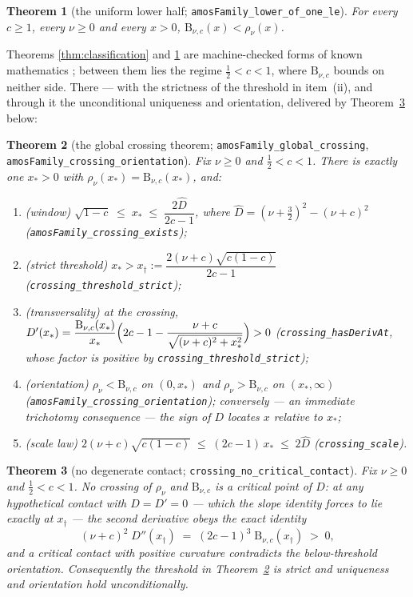 \documentclass[11pt]{article}
\newtheorem{theorem}{Theorem}[section]
\newcommand{\lean}[1]{\texttt{#1}}
\newcommand{\Bfam}{\mathrm{B}}
\begin{document}
\begin{theorem}[the uniform lower half;
\lean{amosFamily\_lower\_of\_one\_le}]\label{thm:lowerhalf}
For every $c \ge 1$, every $\nu \ge 0$ and every $x > 0$,
$\Bfam_{\nu,c}(x) < \rho_\nu(x)$.
\end{theorem}

Theorems \ref{thm:classification} and \ref{thm:lowerhalf} are
machine-checked forms of known mathematics \cite{RS16}; between
them lies the regime $\tfrac12 < c < 1$, where $\Bfam_{\nu,c}$
bounds on neither side.  There --- with the strictness of the
threshold in item~(ii), and through it the unconditional uniqueness
and orientation, delivered by Theorem~\ref{thm:nocontact} below:

\begin{theorem}[the global crossing theorem;
\lean{amosFamily\_global\_crossing},
\lean{amosFamily\_crossing\_orientation}]\label{thm:crossing}
Fix $\nu \ge 0$ and $\tfrac12 < c < 1$.  There is exactly one
$x_* > 0$ with $\rho_\nu(x_*) = \Bfam_{\nu,c}(x_*)$, and:
\begin{enumerate}
\item[(i)] \emph{(window)} $\sqrt{1-c} \;\le\; x_* \;\le\;
\dfrac{2\hat{D}}{2c-1}$, where
$\hat{D} = (\nu+\tfrac32)^2-(\nu+c)^2$
(\lean{amosFamily\_crossing\_exists});
\item[(ii)] \emph{(strict threshold)} $x_* > x_\dagger :=
\dfrac{2(\nu+c)\sqrt{c(1-c)}}{2c-1}$
(\lean{crossing\_threshold\_strict});
\item[(iii)] \emph{(transversality)} at the crossing,
$D'(x_*) = \dfrac{\Bfam_{\nu,c}(x_*)}{x_*}
\Bigl(2c-1-\dfrac{\nu+c}{\sqrt{(\nu+c)^2+x_*^2}}\Bigr) > 0$
(\lean{crossing\_hasDerivAt}, whose factor is positive by
\lean{crossing\_threshold\_strict});
\item[(iv)] \emph{(orientation)} $\rho_\nu < \Bfam_{\nu,c}$ on
$(0, x_*)$ and $\rho_\nu > \Bfam_{\nu,c}$ on $(x_*, \infty)$
(\lean{amosFamily\_crossing\_orientation}); conversely --- an
immediate trichotomy consequence --- the sign of $D$ locates $x$
relative to $x_*$;
\item[(v)] \emph{(scale law)} $2(\nu+c)\sqrt{c(1-c)} \;\le\;
(2c-1)\,x_* \;\le\; 2\hat{D}$ (\lean{crossing\_scale}).
\end{enumerate}
\end{theorem}

\begin{theorem}[no degenerate contact;
\lean{crossing\_no\_critical\_contact}]\label{thm:nocontact}
Fix $\nu \ge 0$ and $\tfrac12 < c < 1$.  No crossing of $\rho_\nu$
and $\Bfam_{\nu,c}$ is a critical point of $D$: at any hypothetical
contact with $D = D' = 0$ --- which the slope identity forces to
lie exactly at $x_\dagger$ --- the second derivative obeys the
exact identity
\[
(\nu+c)^2\; D''(x_\dagger) \;=\; (2c-1)^3\;
\Bfam_{\nu,c}(x_\dagger) \;>\; 0,
\]
and a critical contact with positive curvature contradicts the
below-threshold orientation.  Consequently the threshold in
Theorem~\ref{thm:crossing} is strict and uniqueness and orientation
hold unconditionally.
\end{theorem}
\end{document}
